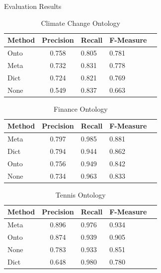 \documentclass[final,hyperref={pdfpagelabels=true}]{beamer}
\begin{document}
\begin{frame}
\begin{columns}[t, onlytextwidth]
\begin{column}{\textwidth}
\begin{columns}[t, onlytextwidth]
\begin{column}{.49\textwidth}
\begin{block}{Evaluation Results}
\begin{minipage}[t][.23\textheight][c]{\textwidth}
\begin{minipage}[t]{0.93\textwidth}
\begin{minipage}[t]{\textwidth}
\begin{minipage}[t]{.48\textwidth}
									\begin{table}
										\scriptsize
										\captionsetup{font=scriptsize}
										\begin{tabularx}{\textwidth}{l c*{3}{Y}}
											\toprule
											Method & Precision & Recall & F-Measure \\
											\midrule
											 Onto & 0.758 & 0.805 & 0.781 \\
											 Meta & 0.732 & 0.831 & 0.778 \\
											 Dict & 0.724 & 0.821 & 0.769 \\
											 None & 0.549 & 0.837 & 0.663 \\
											\bottomrule
										\end{tabularx}
										\caption{Climate Change Ontology}
									\end{table}
									
									\begin{table}
										\scriptsize
										\captionsetup{font=scriptsize}
										\begin{tabularx}{\textwidth}{l c*{3}{Y}}
											\toprule
											Method & Precision & Recall & F-Measure \\
											\midrule
											 Meta & 0.797 & 0.985 & 0.881 \\
											 Dict & 0.794 & 0.944 & 0.862 \\
											 Onto & 0.756 & 0.949 & 0.842 \\
											 None & 0.734 & 0.963 & 0.833 \\
											\bottomrule
										\end{tabularx}
										\caption{Finance Ontology}
									\end{table}
									
									\begin{table}
										\scriptsize
										\captionsetup{font=scriptsize}
										\begin{tabularx}{\textwidth}{l c*{3}{Y}}
											\toprule
											Method & Precision & Recall & F-Measure \\
											\midrule
											 Meta & 0.896 & 0.976 & 0.934 \\
											 Onto & 0.874 & 0.939 & 0.905 \\ 
											 None & 0.783 & 0.933 & 0.851 \\
											 Dict & 0.648 & 0.980 & 0.780 \\
											\bottomrule
										\end{tabularx}
										\caption{Tennis Ontology}
									\end{table}
									

\end{minipage}
\end{minipage}
\end{minipage}
\end{minipage}
\end{block}
\end{column}
\end{columns}
\end{column}
\end{columns}
\end{frame}
\end{document}
